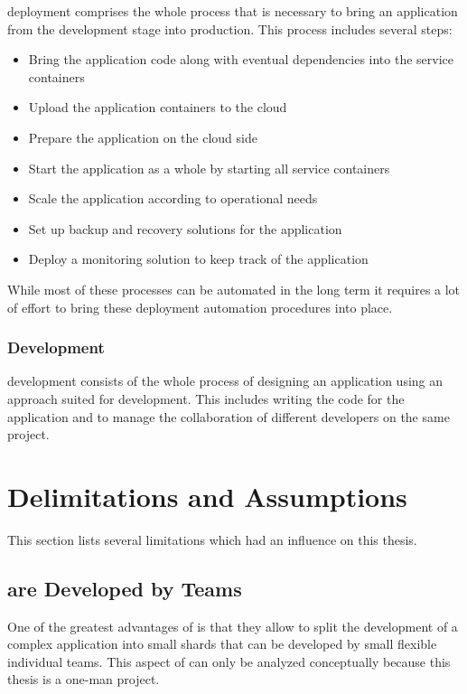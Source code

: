 \ms{} deployment comprises the whole process that is necessary to bring an
application from the development stage into production. This process includes
several steps:

\begin{itemize}
  \item Bring the application code along with eventual dependencies into the
  service containers
  \item Upload the application containers to the cloud
  \item Prepare the application on the cloud side
  \item Start the application as a whole by starting all service containers
  \item Scale the application according to operational needs
  \item Set up backup and recovery solutions for the application
  \item Deploy a monitoring solution to keep track of the application
\end{itemize}

While most of these processes can be automated in the long term it requires a
lot of effort to bring these deployment automation procedures into place.

\subsubsection{\ms{} Development}

\ms{} development consists of the whole process of designing an application
using an approach suited for \ms{} development. This includes writing the code
for the application and to manage the collaboration of different developers on
the same project.

\section{Delimitations and Assumptions}

This section lists several limitations which had an influence on this
thesis.

\subsection{\mss{} are Developed by Teams}
One of the greatest advantages of \mss{} is that they allow to split the
development of a complex application into small shards that can be developed by
small flexible individual teams. This aspect of \mss{} can only be analyzed
conceptually because this thesis is a one-man project.

